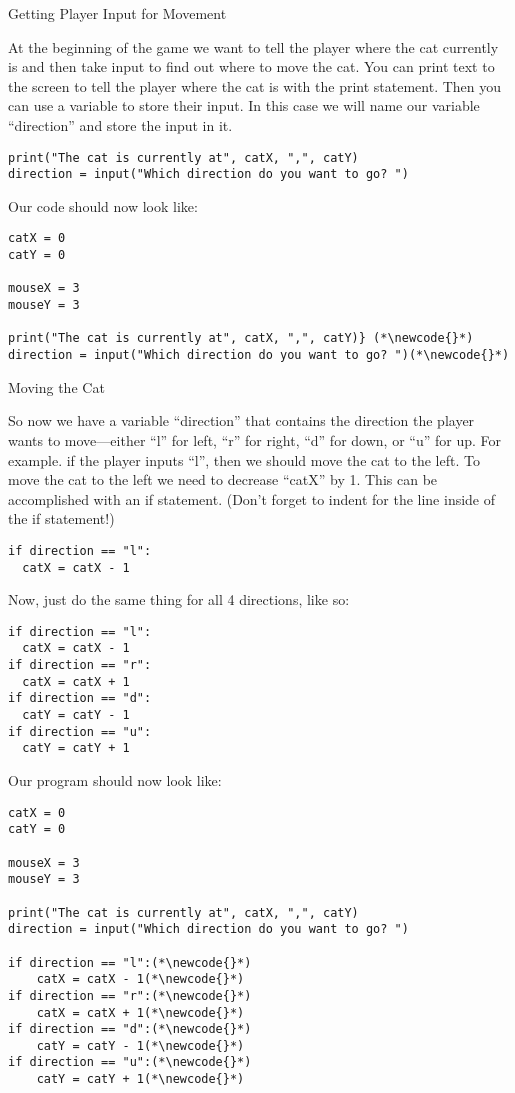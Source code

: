 \documentclass[12pt,oneside]{article}
\newcommand{\q}[1]{``#1''}
\newcommand{\subsectitle}[1]{
  \begin{flushleft}{\large#1}\end{flushleft}
}
\newcommand{\newcode}[0]{\hfill<--}
\begin{document}
\begin{minipage}{\textwidth}
\subsectitle{Getting Player Input for Movement}

At the beginning of the game we want to tell the player where the cat currently is and then take input to find out where to move the cat. You can print text to the screen to tell the player where the cat is with the print statement. Then you can use a variable to store their input. In this case we will name our variable \q{direction} and store the input in it.

\begin{lstlisting}
print("The cat is currently at", catX, ",", catY)
direction = input("Which direction do you want to go? ")
\end{lstlisting}

Our code should now look like:

\begin{lstlisting}
catX = 0
catY = 0

mouseX = 3
mouseY = 3

print("The cat is currently at", catX, ",", catY)} (*\newcode{}*)
direction = input("Which direction do you want to go? ")(*\newcode{}*)
\end{lstlisting}
\end{minipage}

\begin{minipage}{\textwidth}
\subsectitle{Moving the Cat}
So now we have a variable \q{direction} that contains the direction the player wants to move---either \q{l} for left, \q{r} for right, \q{d} for down, or \q{u} for up. For example. if the player inputs \q{l}, then we should move the cat to the left. To move the cat to the left we need to decrease \q{catX} by 1. This can be accomplished with an if statement. (Don't forget to indent for the line inside of the if statement!)

\begin{lstlisting}
if direction == "l":
  catX = catX - 1
\end{lstlisting}

Now, just do the same thing for all 4 directions, like so:

\begin{lstlisting}
if direction == "l":
  catX = catX - 1
if direction == "r":
  catX = catX + 1
if direction == "d":
  catY = catY - 1
if direction == "u":
  catY = catY + 1
\end{lstlisting}

Our program should now look like:

\begin{lstlisting}
catX = 0
catY = 0

mouseX = 3
mouseY = 3

print("The cat is currently at", catX, ",", catY)
direction = input("Which direction do you want to go? ")

if direction == "l":(*\newcode{}*)
    catX = catX - 1(*\newcode{}*)
if direction == "r":(*\newcode{}*)
    catX = catX + 1(*\newcode{}*)
if direction == "d":(*\newcode{}*)
    catY = catY - 1(*\newcode{}*)
if direction == "u":(*\newcode{}*)
    catY = catY + 1(*\newcode{}*)
\end{lstlisting}
\end{minipage}
\end{document}
